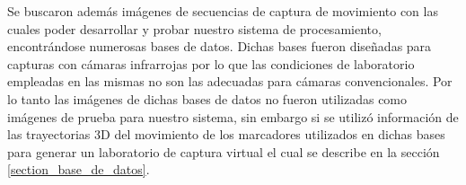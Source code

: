\hspace*{0.5cm}Se buscaron además imágenes de secuencias de captura de movimiento con las cuales poder desarrollar y probar nuestro sistema de procesamiento, encontrándose numerosas bases de datos. Dichas bases fueron diseñadas para capturas con cámaras infrarrojas por lo que las condiciones de laboratorio empleadas en las mismas no son las adecuadas para cámaras convencionales. Por lo tanto las imágenes de dichas bases de datos no fueron utilizadas como imágenes de prueba para nuestro sistema, sin embargo si se utilizó información de las trayectorias 3D del movimiento de los marcadores utilizados en dichas bases para generar un laboratorio de captura virtual el cual se describe en  la sección \ref{section_base_de_datos}.

  




















